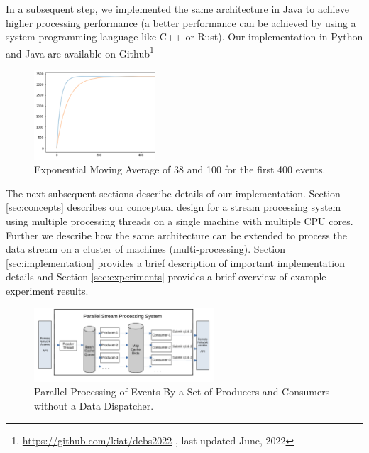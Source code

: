 In a subsequent step, we implemented the same architecture in Java to achieve higher processing 
performance (a better performance can be achieved by using a system programming language like C++ or Rust).  
Our implementation in Python and Java are available on Github\footnote{\url{https://github.com/kiat/debs2022} , last updated June, 2022}



\begin{figure}[ht]
    \begin{center}
        \includegraphics[width=0.4\textwidth]{./images/query2_example_200.png}
        \caption{Exponential Moving Average of 38 and 100 for the first 400 events.}
        \label{fig:EMA200}
    \end{center}
\end{figure}


The next subsequent sections describe details of our implementation. Section \ref{sec:concepts} describes our conceptual design for
a stream processing system using multiple processing threads on a single machine with multiple CPU cores. Further we describe how the same
architecture can be extended to process the data stream on a cluster of machines (multi-processing).  Section \ref{sec:implementation} provides
a brief description of important implementation details and Section \ref{sec:experiments} provides a brief overview of example
experiment results.



\begin{figure}[ht]
    \begin{center}
        \includegraphics[width=0.6\textwidth]{./images/Parallel-Stream-Processing-System_v2}
        \caption{Parallel Processing of Events By a Set of Producers and Consumers without a Data Dispatcher.}
        \label{fig:parallel-srream-processing1}
    \end{center}
\end{figure}